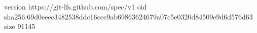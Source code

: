 version https://git-lfs.github.com/spec/v1
oid sha256:69d0eeec3482538ddc16cce9ab69863624679a07c5e0320d84509e9d6d576d63
size 91145
